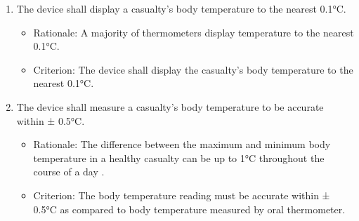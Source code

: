 \documentclass{article}
\begin{document}
\begin{enumerate}[label = \textbf{{FR5.}\arabic*} ]
        \item The device shall display a casualty's body temperature to the nearest 0.1°C. %
            \begin{itemize}
                \item Rationale: A majority of thermometers display temperature to the nearest 0.1°C. 
                \item Criterion: The device shall display the casualty's body temperature to the nearest 0.1°C. 
            \end{itemize}
            
        \item The device shall measure a casualty's body temperature to be accurate within ± 0.5°C.
            \begin{itemize}
                \item Rationale: The difference between the maximum and minimum body temperature in a healthy casualty can be up to 1°C throughout the course of a day \citep{bt1}. 
                \item Criterion: The body temperature reading must be accurate within ± 0.5°C as compared to body temperature measured by oral thermometer. 
            \end{itemize}
        \end{enumerate}
        
\end{document}
